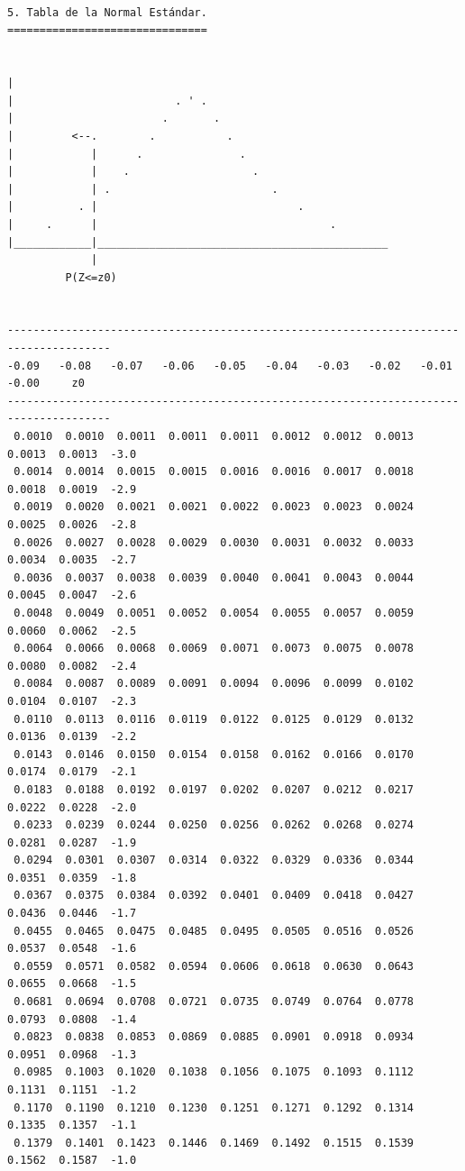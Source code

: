 \begin{verbatim}
 


5. Tabla de la Normal Estándar.
===============================


|
|                         . ' .
|                       .       .
|         <--.        .           .
|            |      .               .
|            |    .                   .
|            | .                         .
|          . |                               .
|     .      |                                    .
|____________|_____________________________________________
             |
         P(Z<=z0)


--------------------------------------------------------------------------------------
-0.09   -0.08   -0.07   -0.06   -0.05   -0.04   -0.03   -0.02   -0.01   -0.00     z0
--------------------------------------------------------------------------------------
 0.0010  0.0010  0.0011  0.0011  0.0011  0.0012  0.0012  0.0013  0.0013  0.0013  -3.0
 0.0014  0.0014  0.0015  0.0015  0.0016  0.0016  0.0017  0.0018  0.0018  0.0019  -2.9
 0.0019  0.0020  0.0021  0.0021  0.0022  0.0023  0.0023  0.0024  0.0025  0.0026  -2.8
 0.0026  0.0027  0.0028  0.0029  0.0030  0.0031  0.0032  0.0033  0.0034  0.0035  -2.7
 0.0036  0.0037  0.0038  0.0039  0.0040  0.0041  0.0043  0.0044  0.0045  0.0047  -2.6
 0.0048  0.0049  0.0051  0.0052  0.0054  0.0055  0.0057  0.0059  0.0060  0.0062  -2.5
 0.0064  0.0066  0.0068  0.0069  0.0071  0.0073  0.0075  0.0078  0.0080  0.0082  -2.4
 0.0084  0.0087  0.0089  0.0091  0.0094  0.0096  0.0099  0.0102  0.0104  0.0107  -2.3
 0.0110  0.0113  0.0116  0.0119  0.0122  0.0125  0.0129  0.0132  0.0136  0.0139  -2.2
 0.0143  0.0146  0.0150  0.0154  0.0158  0.0162  0.0166  0.0170  0.0174  0.0179  -2.1
 0.0183  0.0188  0.0192  0.0197  0.0202  0.0207  0.0212  0.0217  0.0222  0.0228  -2.0
 0.0233  0.0239  0.0244  0.0250  0.0256  0.0262  0.0268  0.0274  0.0281  0.0287  -1.9
 0.0294  0.0301  0.0307  0.0314  0.0322  0.0329  0.0336  0.0344  0.0351  0.0359  -1.8
 0.0367  0.0375  0.0384  0.0392  0.0401  0.0409  0.0418  0.0427  0.0436  0.0446  -1.7
 0.0455  0.0465  0.0475  0.0485  0.0495  0.0505  0.0516  0.0526  0.0537  0.0548  -1.6
 0.0559  0.0571  0.0582  0.0594  0.0606  0.0618  0.0630  0.0643  0.0655  0.0668  -1.5
 0.0681  0.0694  0.0708  0.0721  0.0735  0.0749  0.0764  0.0778  0.0793  0.0808  -1.4
 0.0823  0.0838  0.0853  0.0869  0.0885  0.0901  0.0918  0.0934  0.0951  0.0968  -1.3
 0.0985  0.1003  0.1020  0.1038  0.1056  0.1075  0.1093  0.1112  0.1131  0.1151  -1.2
 0.1170  0.1190  0.1210  0.1230  0.1251  0.1271  0.1292  0.1314  0.1335  0.1357  -1.1
 0.1379  0.1401  0.1423  0.1446  0.1469  0.1492  0.1515  0.1539  0.1562  0.1587  -1.0

\end{verbatim}

